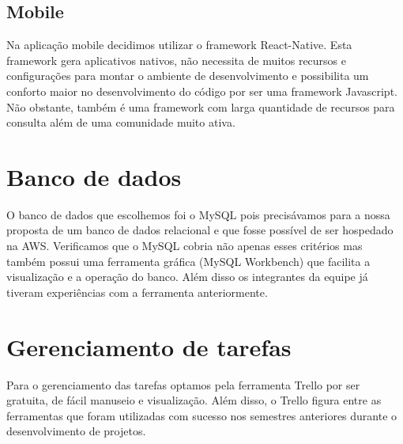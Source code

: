 \subsection{Mobile}
Na aplicação mobile decidimos utilizar o framework React-Native. Esta framework gera aplicativos nativos, não necessita de muitos recursos e configurações para montar o ambiente de desenvolvimento e possibilita um conforto maior no desenvolvimento do código por ser uma framework Javascript. Não obstante, também é uma framework com larga quantidade de recursos para consulta além de uma comunidade muito ativa.

\section{Banco de dados}
O banco de dados que escolhemos foi o MySQL pois precisávamos para a nossa proposta de um banco de dados relacional e que fosse possível de ser hospedado na AWS. Verificamos que o MySQL cobria não apenas esses critérios mas também possui uma ferramenta gráfica (MySQL Workbench) que facilita a visualização e a operação do banco. Além disso os integrantes da equipe já tiveram experiências com a ferramenta anteriormente.

\section{Gerenciamento de tarefas}
Para o gerenciamento das tarefas optamos pela ferramenta Trello por ser gratuita, de fácil manuseio e visualização.
Além disso, o Trello figura entre as ferramentas que foram utilizadas com sucesso nos semestres anteriores durante o desenvolvimento de projetos.




